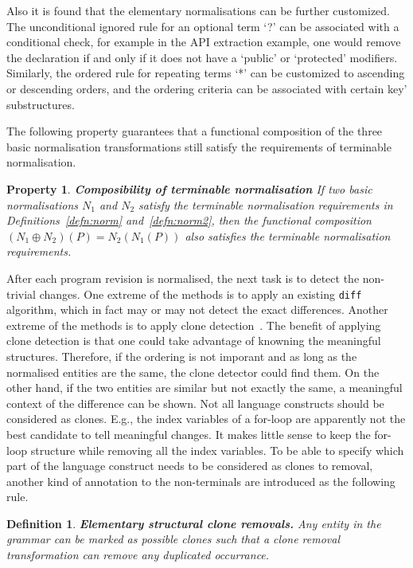 \documentclass[10pt, conference, compsocconf]{IEEEtran}
\newtheorem{property}{Property}
\newtheorem{definition}{Definition}
\begin{document}
Also it is found that the elementary normalisations can be further customized. The unconditional ignored rule for an optional term `?' can be associated with a conditional check, for example in the API extraction example, one would remove the declaration if and only if it does not have a `public' or `protected' modifiers. Similarly, the ordered rule for repeating terms `*' can be customized to ascending or descending orders, and the ordering criteria can be associated with certain key' substructures.

The following property guarantees that a functional composition of the three basic normalisation transformations still satisfy the requirements of terminable normalisation.
\begin{property} {\bf Composibility of terminable normalisation}
If two basic normalisations $N_1$ and $N_2$ satisfy the terminable normalisation requirements in Definitions~\ref{defn:norm} and~\ref{defn:norm2}, then the functional composition $(N_1 \oplus N_2) (P) = N_2 (N_1(P))$ also satisfies the terminable normalisation requirements.
\end{property}

After each program revision is normalised, the next task is to detect the non-trivial changes. One extreme of  the methods is to apply an existing {\tt diff} algorithm, which in fact may or may not detect the exact differences.  Another extreme of the methods is to apply clone detection~\cite{DBLP:conf/iwpc/RoyC08a}. The benefit of applying clone detection is that one could take advantage of knowning the meaningful structures. Therefore, if the ordering is not imporant and as long as the normalised entities are the same, the clone detector could find them. On  the other hand, if the two entities are similar but not exactly the same, a meaningful context of the difference can be shown.
Not all language constructs should be considered as clones. E.g., the index variables of a for-loop are apparently not the best candidate to tell meaningful changes. It makes little sense to keep the for-loop structure while removing all the index variables.
To be able to specify which part of the language construct needs to be considered as clones to removal, another kind of annotation to the non-terminals are introduced as the following rule. 

\begin{definition}
{\bf Elementary structural clone removals.\label{defn:norm5}} Any entity in the grammar can be marked as possible clones such that a clone removal transformation can remove any duplicated occurrance. 
\end{definition}
\end{document}
